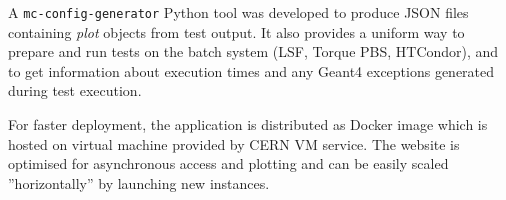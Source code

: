 A {\tt mc-config-generator} Python tool was developed to produce JSON files containing \textit{plot} objects from test output. It also provides a uniform way to prepare and run tests on the batch system (LSF, Torque PBS, HTCondor), and to get information about execution times and any Geant4 exceptions generated during test execution.

For faster deployment, the application is distributed as Docker image which is hosted on virtual machine provided by CERN VM service. The website is optimised for asynchronous access and plotting and can be easily scaled ''horizontally'' by launching new instances.%